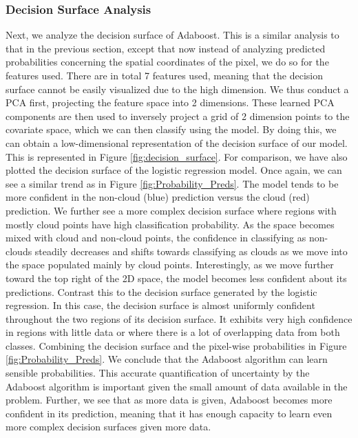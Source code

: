 \documentclass[11pt, letterpaper, journal]{IEEEtran}
\begin{document}
\subsubsection{Decision Surface Analysis}
Next, we analyze the decision surface of Adaboost. This is a similar analysis to that in the previous section, except that now instead of analyzing predicted probabilities concerning the spatial coordinates of the pixel, we do so for the features used. There are in total 7 features used, meaning that the decision surface cannot be easily visualized due to the high dimension. We thus conduct a PCA first, projecting the feature space into 2 dimensions. These learned PCA components are then used to inversely project a grid of 2 dimension points to the covariate space, which we can then classify using the model. By doing this, we can obtain a low-dimensional representation of the decision surface of our model. This is represented in Figure \ref{fig:decision_surface}. For comparison, we have also plotted the decision surface of the logistic regression model. Once again, we can see a similar trend as in Figure \ref{fig:Probability_Preds}. The model tends to be more confident in the non-cloud (blue) prediction versus the cloud (red) prediction. We further see a more complex decision surface where regions with mostly cloud points have high classification probability. As the space becomes mixed with cloud and non-cloud points, the confidence in classifying as non-clouds steadily decreases and shifts towards classifying as clouds as we move into the space populated mainly by cloud points. Interestingly, as we move further toward the top right of the 2D space, the model becomes less confident about its predictions. Contrast this to the decision surface generated by the logistic regression. In this case, the decision surface is almost uniformly confident throughout the two regions of its decision surface. It exhibits very high confidence in regions with little data or where there is a lot of overlapping data from both classes. Combining the decision surface and the pixel-wise probabilities in Figure \ref{fig:Probability_Preds}. We conclude that the Adaboost algorithm can learn sensible probabilities. This accurate quantification of uncertainty by the Adaboost algorithm is important given the small amount of data available in the problem. Further, we see that as more data is given, Adaboost becomes more confident in its prediction, meaning that it has enough capacity to learn even more complex decision surfaces given more data.
\end{document}
